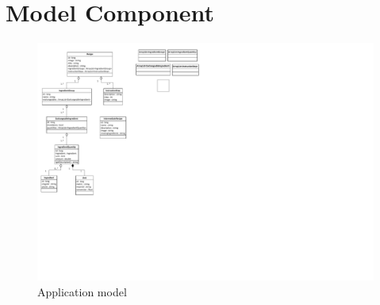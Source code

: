\section{Model Component}

\begin{figure}[H]
\centering
\includegraphics[width=0.7\linewidth, page=2]{img/model.pdf}
\caption{Application model}
\label{fig:model}
\end{figure}

